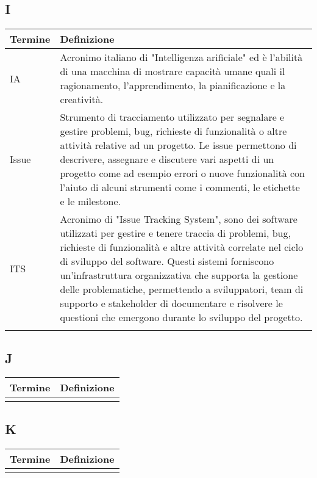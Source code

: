 \documentclass[10pt]{article}
\begin{document}
\subsection{I} %
\begin{tabularx}{\textwidth}{|>{\centering\arraybackslash}l|X|}
\hline
\rowcolor[gray]{0.8}
\textbf{Termine} & \textbf{Definizione}\\
\hline
IA & Acronimo italiano di "Intelligenza arificiale" ed è l'abilità di una macchina di mostrare capacità umane quali il ragionamento, l’apprendimento, la pianificazione e la creatività.\\
\hline
Issue & Strumento di tracciamento utilizzato per segnalare e gestire problemi, bug, richieste di funzionalità o altre attività relative ad un progetto. Le issue permettono di descrivere, assegnare e discutere vari aspetti di un progetto come ad esempio errori o nuove funzionalità con l'aiuto di alcuni strumenti come i commenti, le etichette e le milestone.\\
\hline
ITS & Acronimo di "Issue Tracking System", sono dei software utilizzati per gestire e tenere traccia di problemi, bug, richieste di funzionalità e altre attività correlate nel ciclo di sviluppo del software. Questi sistemi forniscono un'infrastruttura organizzativa che supporta la gestione delle problematiche, permettendo a sviluppatori, team di supporto e stakeholder di documentare e risolvere le questioni che emergono durante lo sviluppo del progetto.\\
\hline
 & \\
\hline
\end{tabularx}

\subsection{J} %
\begin{tabularx}{\textwidth}{|>{\centering\arraybackslash}l|X|}
\hline
\rowcolor[gray]{0.8}
\textbf{Termine} & \textbf{Definizione}\\
\hline
 & \\
\hline
\end{tabularx}

\subsection{K} %
\begin{tabularx}{\textwidth}{|>{\centering\arraybackslash}l|X|}
\hline
\rowcolor[gray]{0.8}
\textbf{Termine} & \textbf{Definizione}\\
\hline
 & \\
\hline
\end{tabularx}
\end{document}
